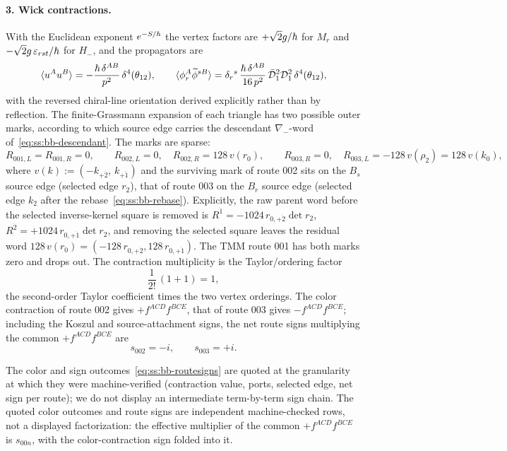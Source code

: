 \paragraph{3. Wick contractions.} With the Euclidean exponent $e^{-S/\hbar}$ the
vertex factors are $+\sqrt2 g/\hbar$ for $M_r$ and
$-\sqrt2 g\,\varepsilon_{rst}/\hbar$ for $H_-$, and the propagators are
\begin{equation}\label{eq:ss:bb-propagators}
\langle u^{A}u^{B}\rangle=-\frac{\hbar\,\delta^{AB}}{p^{2}}\,\delta^{4}(\theta_{12}),
\qquad
\langle\phi_r^{A}\widetilde\phi^{sB}\rangle
=\delta_r{}^{s}\,\frac{\hbar\,\delta^{AB}}{16\,p^{2}}\,
\bar{\mathcal{D}}_1^{2}\mathcal{D}_1^{2}\,\delta^{4}(\theta_{12}),
\end{equation}
with the reversed chiral-line orientation derived explicitly rather than by
reflection. The finite-Grassmann expansion of each triangle has two possible
outer marks, according to which source edge carries the descendant
$\nabla_-$-word of~\eqref{eq:ss:bb-descendant}. The marks are sparse:
\begin{equation}\label{eq:ss:bb-marks}
R_{001,L}=R_{001,R}=0,\qquad
R_{002,L}=0,\quad R_{002,R}=128\,v(r_0),\qquad
R_{003,R}=0,\quad R_{003,L}=-128\,v(\rho_2)=128\,v(k_0),
\end{equation}
where $v(k):=(-k_{+\dot2},\,k_{+\dot1})$ and the surviving mark of route 002
sits on the $B_s$ source edge (selected edge $r_2$), that of route 003 on the
$B_r$ source edge (selected edge $k_2$ after the
rebase~\eqref{eq:ss:bb-rebase}). Explicitly, the raw parent word before the
selected inverse-kernel square is removed is
$R^{\dot1}=-1024\,r_{0,+\dot2}\det r_2$,
$R^{\dot2}=+1024\,r_{0,+\dot1}\det r_2$, and removing the selected square
leaves the residual word $128\,v(r_0)=(-128\,r_{0,+\dot2},128\,r_{0,+\dot1})$.
The TMM route 001 has both marks zero and drops out. The contraction
multiplicity is the Taylor/ordering factor
\begin{equation}\label{eq:ss:bb-taylor}
\frac{1}{2!}\,(1+1)=1,
\end{equation}
the second-order Taylor coefficient times the two vertex orderings. The color
contraction of route 002 gives $+f^{ACD}f^{BCE}$, that of route 003 gives
$-f^{ACD}f^{BCE}$; including the Koszul and source-attachment signs, the net
route signs multiplying the common $+f^{ACD}f^{BCE}$ are
\begin{equation}\label{eq:ss:bb-routesigns}
s_{002}=-i,\qquad s_{003}=+i .
\end{equation}

\begin{remark}\label{rem:ss:bbsignchain}
The color and sign outcomes~\eqref{eq:ss:bb-routesigns} are quoted at the
granularity at which they were machine-verified (contraction value, ports,
selected edge, net sign per route); we do not display an intermediate
term-by-term sign chain. The quoted color outcomes and route signs are
independent machine-checked rows, not a displayed factorization: the
effective multiplier of the common $+f^{ACD}f^{BCE}$ is $s_{00n}$, with the
color-contraction sign folded into it.
\end{remark}

